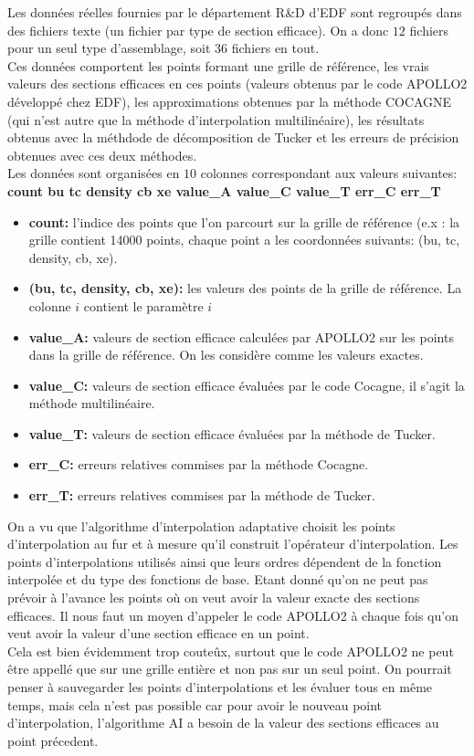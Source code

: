 \vspace{0.5cm}
Les données réelles fournies par le département R\&D d'EDF sont regroupés dans des fichiers texte (un fichier par type de section efficace).
On a donc $12$ fichiers pour un seul type d'assemblage, soit $36$ fichiers en tout.\\
Ces données comportent les points formant une grille de référence, les vrais valeurs des sections efficaces en ces points (valeurs obtenus par le code APOLLO2 développé chez EDF),
les approximations obtenues par la méthode COCAGNE (qui n'est autre que la méthode d'interpolation multilinéaire), les résultats obtenus avec la méthdode de décomposition de Tucker et
les erreurs de précision obtenues avec ces deux méthodes.\\
Les données sont organisées en $10$ colonnes correspondant aux valeurs suivantes: \textbf{count bu tc density cb xe value\_A value\_C value\_T err\_C err\_T}
\begin{itemize}
\item \textbf{count:} l'indice des points que l'on parcourt sur la grille de référence (e.x : la grille contient 14000 points, chaque point a les coordonnées suivants: (bu, tc, density, cb, xe).
\item \textbf{(bu, tc, density, cb, xe):} les valeurs des points de la grille de référence. La colonne $i$ contient le paramètre $i$
\item \textbf{value\_A:} valeurs de section efficace calculées par APOLLO2 sur les points dans la grille de référence. On les considère comme les valeurs exactes.
\item \textbf{value\_C:} valeurs de section efficace évaluées par le code Cocagne, il s'agit la méthode multilinéaire.
\item \textbf{value\_T:} valeurs de section efficace évaluées par la méthode de Tucker.
\item \textbf{err\_C:} erreurs relatives commises par la méthode Cocagne.
\item \textbf{err\_T:} erreurs relatives commises par la méthode de Tucker.
\end{itemize}

On a vu que l'algorithme d'interpolation adaptative choisit les points d'interpolation au fur et à mesure qu'il construit l'opérateur d'interpolation.
Les points d'interpolations utilisés ainsi que leurs ordres dépendent de la fonction interpolée et du type des fonctions de base.
Etant donné qu'on ne peut pas prévoir à l'avance les points où on veut avoir la valeur exacte des sections efficaces.
Il nous faut un moyen d'appeler le code APOLLO2 à chaque fois qu'on veut avoir la valeur d'une section efficace en un point.\\
\hspace{0.5cm}
Cela est bien évidemment trop couteûx, surtout que le code APOLLO2 ne peut être appellé que sur une grille entière et non pas sur un seul point.
On pourrait penser à sauvegarder les points d'interpolations et les évaluer tous en même temps, mais cela n'est pas possible car pour avoir le nouveau point d'interpolation, l'algorithme AI
a besoin de la valeur des sections efficaces au point précedent.\\

